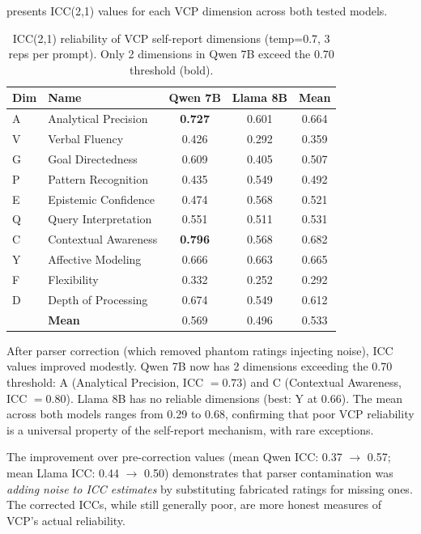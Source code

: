 \documentclass[11pt,a4paper]{article}
\begin{document}
 presents ICC(2,1) values for each VCP dimension across both tested models.

\begin{table}[H]
\centering
\caption{ICC(2,1) reliability of VCP self-report dimensions (temp=0.7, 3 reps per prompt). Only 2 dimensions in Qwen 7B exceed the 0.70 threshold (bold).}
\label{tab:icc}
\begin{tabular}{llccc}
\toprule
\textbf{Dim} & \textbf{Name} & \textbf{Qwen 7B} & \textbf{Llama 8B} & \textbf{Mean} \\
\midrule
A & Analytical Precision  & \textbf{0.727} & 0.601 & 0.664 \\
V & Verbal Fluency        & 0.426 & 0.292 & 0.359 \\
G & Goal Directedness     & 0.609 & 0.405 & 0.507 \\
P & Pattern Recognition   & 0.435 & 0.549 & 0.492 \\
E & Epistemic Confidence  & 0.474 & 0.568 & 0.521 \\
Q & Query Interpretation  & 0.551 & 0.511 & 0.531 \\
C & Contextual Awareness  & \textbf{0.796} & 0.568 & 0.682 \\
Y & Affective Modeling     & 0.666 & 0.663 & 0.665 \\
F & Flexibility           & 0.332 & 0.252 & 0.292 \\
D & Depth of Processing   & 0.674 & 0.549 & 0.612 \\
\midrule
  & \textbf{Mean}         & 0.569 & 0.496 & 0.533 \\
\bottomrule
\end{tabular}
\end{table}

After parser correction (which removed phantom ratings injecting noise), ICC values improved modestly. Qwen 7B now has 2 dimensions exceeding the 0.70 threshold: A (Analytical Precision, ICC $= 0.73$) and C (Contextual Awareness, ICC $= 0.80$). Llama 8B has no reliable dimensions (best: Y at 0.66). The mean across both models ranges from 0.29 to 0.68, confirming that poor VCP reliability is a universal property of the self-report mechanism, with rare exceptions.

The improvement over pre-correction values (mean Qwen ICC: 0.37 $\to$ 0.57; mean Llama ICC: 0.44 $\to$ 0.50) demonstrates that parser contamination was \emph{adding noise to ICC estimates} by substituting fabricated ratings for missing ones. The corrected ICCs, while still generally poor, are more honest measures of VCP's actual reliability.
\end{document}

